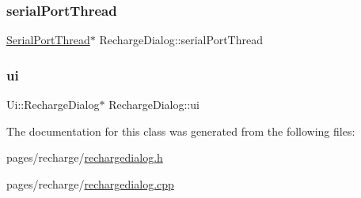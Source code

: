 \mbox{\label{class_recharge_dialog_a9d33c6c98810ddf8958e6055aa6664af}} 
\subsubsection{\texorpdfstring{serialPortThread}{serialPortThread}}
{\footnotesize\ttfamily \mbox{\hyperlink{class_serial_port_thread}{Serial\+Port\+Thread}}$\ast$ Recharge\+Dialog\+::serial\+Port\+Thread\hspace{0.3cm}{\ttfamily [private]}}

\mbox{\label{class_recharge_dialog_ab496c91dc8ba4fcc23c21e9f372af5a9}} 
\subsubsection{\texorpdfstring{ui}{ui}}
{\footnotesize\ttfamily Ui\+::\+Recharge\+Dialog$\ast$ Recharge\+Dialog\+::ui\hspace{0.3cm}{\ttfamily [private]}}



The documentation for this class was generated from the following files\+:\begin{DoxyCompactItemize}
\item 
pages/recharge/\mbox{\hyperlink{rechargedialog_8h}{rechargedialog.\+h}}\item 
pages/recharge/\mbox{\hyperlink{rechargedialog_8cpp}{rechargedialog.\+cpp}}\end{DoxyCompactItemize}
